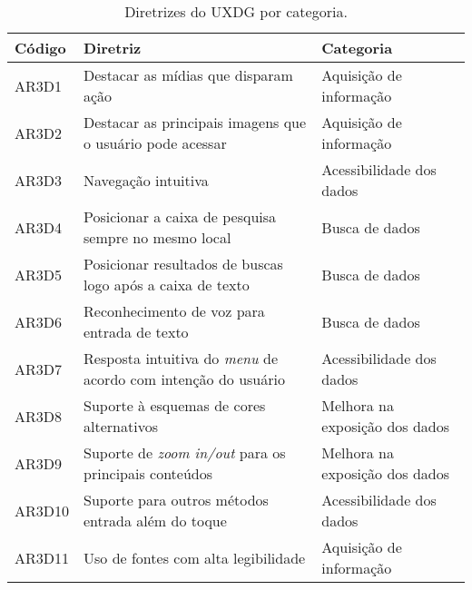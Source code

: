 \begin{table}[htb]
  \begin{center}
    \ABNTEXfontereduzida
    \caption{Diretrizes do UXDG por categoria.}
    \label{tab-acc-dir-uxd-1}
    \begin{tabular}{p{1.2cm}|p{8.8cm}|p{4.5cm}}
      \textbf{Código} & \textbf{Diretriz}                                                   & \textbf{Categoria}             \\
      \hline
      AR3D1           & Destacar as mídias que disparam ação                                & Aquisição de informação        \\
      \hline
      AR3D2           & Destacar as principais imagens que o usuário pode acessar           & Aquisição de informação        \\
      \hline
      AR3D3           & Navegação intuitiva                                                 & Acessibilidade dos dados       \\
      \hline
      AR3D4           & Posicionar a caixa de pesquisa sempre no mesmo local                & Busca de dados                 \\
      \hline
      AR3D5           & Posicionar resultados de buscas logo após a caixa de texto          & Busca de dados                 \\
      \hline
      AR3D6           & Reconhecimento de voz para entrada de texto                         & Busca de dados                 \\
      \hline
      AR3D7           & Resposta intuitiva do \emph{menu} de acordo com intenção do usuário & Acessibilidade dos dados       \\
      \hline
      AR3D8           & Suporte à esquemas de cores alternativos                            & Melhora na exposição dos dados \\
      \hline
      AR3D9           & Suporte de \emph{zoom in/out} para os principais conteúdos          & Melhora na exposição dos dados \\
      \hline
      AR3D10          & Suporte para outros métodos entrada além do toque                   & Acessibilidade dos dados       \\
      \hline
      AR3D11          & Uso de fontes com alta legibilidade                                 & Aquisição de informação        \\
    \end{tabular}
  \end{center}
\end{table}

